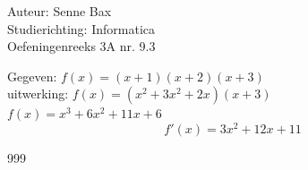 \documentclass[a4paper]{article}
\begin{document}
  
\noindent \large Auteur: Senne Bax \\
\noindent \large Studierichting: Informatica\\
\noindent \large Oefeningenreeks 3A nr. 9.3\\

\medskip

\normalsize



Gegeven:
$f(x) = (x+1)(x+2)(x+3)$\\


uitwerking:
$f(x) = (x^2 + 3x^2 +2x)(x+3)$\\

$f(x) = x^3 + 6x^2 +11x + 6$\\

$$
\boxed{f'(x) = 3x^2 + 12x +11}
$$


\begin{thebibliography}{999}
\end{thebibliography}
\end{document}
